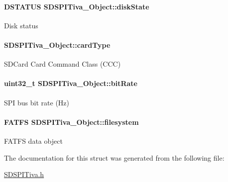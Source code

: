 \paragraph[{disk\+State}]{\setlength{\rightskip}{0pt plus 5cm}D\+S\+T\+A\+T\+U\+S S\+D\+S\+P\+I\+Tiva\+\_\+\+Object\+::disk\+State}\label{struct_s_d_s_p_i_tiva___object_ad6d1084d70028145483de412f3214e4b}
Disk status 
\paragraph[{card\+Type}]{ S\+D\+S\+P\+I\+Tiva\+\_\+\+Object\+::card\+Type}\label{struct_s_d_s_p_i_tiva___object_aff179e7ccea883efed7d8d16f6fd9917}
S\+D\+Card Card Command Class (C\+C\+C) 
\paragraph[{bit\+Rate}]{\setlength{\rightskip}{0pt plus 5cm}uint32\+\_\+t S\+D\+S\+P\+I\+Tiva\+\_\+\+Object\+::bit\+Rate}\label{struct_s_d_s_p_i_tiva___object_a1cd6cec603b463bb38884ca6b0f939cc}
S\+P\+I bus bit rate (Hz) 
\paragraph[{filesystem}]{\setlength{\rightskip}{0pt plus 5cm}F\+A\+T\+F\+S S\+D\+S\+P\+I\+Tiva\+\_\+\+Object\+::filesystem}\label{struct_s_d_s_p_i_tiva___object_a64192599a4d272f2b931c5f8a42df808}
F\+A\+T\+F\+S data object 

The documentation for this struct was generated from the following file\+:\begin{DoxyCompactItemize}
\item 
\hyperlink{_s_d_s_p_i_tiva_8h}{S\+D\+S\+P\+I\+Tiva.\+h}\end{DoxyCompactItemize}
